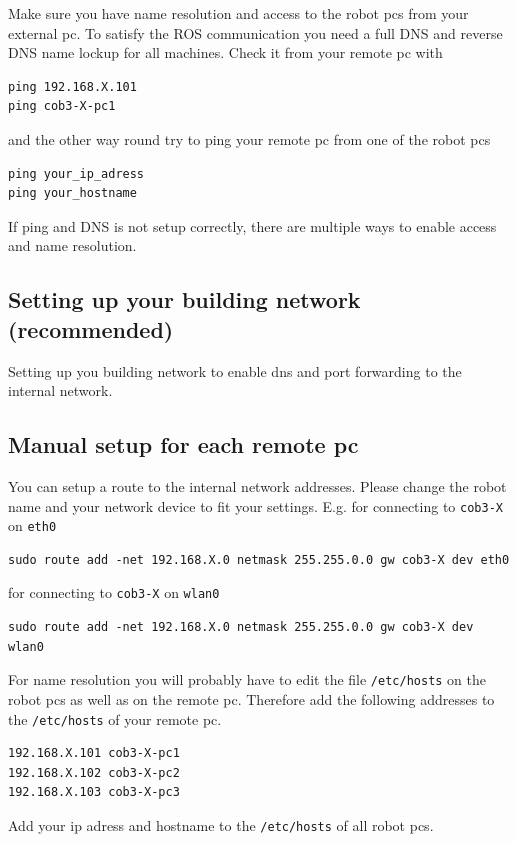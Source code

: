 Make sure you have name resolution and access to the robot pcs from your external pc. To satisfy the ROS communication you need a full DNS and reverse DNS name lockup for all machines. Check it from your remote pc with
\begin{lstlisting}
ping 192.168.X.101
ping cob3-X-pc1
\end{lstlisting}
and the other way round try to ping your remote pc from one of the robot pcs
\begin{lstlisting}
ping your_ip_adress
ping your_hostname
\end{lstlisting}

If ping and DNS is not setup correctly, there are multiple ways to enable access and name resolution.

\subsection{Setting up your building network (recommended)}
Setting up you building network to enable dns and port forwarding to the internal network.

\subsection{Manual setup for each remote pc}
You can setup a route to the internal network addresses. Please change the robot name and your network device to fit your settings. E.g. for connecting to \texttt{cob3-X} on \texttt{eth0}
\begin{lstlisting}
sudo route add -net 192.168.X.0 netmask 255.255.0.0 gw cob3-X dev eth0
\end{lstlisting}

for connecting to \texttt{cob3-X} on \texttt{wlan0}
\begin{lstlisting}
sudo route add -net 192.168.X.0 netmask 255.255.0.0 gw cob3-X dev wlan0
\end{lstlisting}


For name resolution you will probably have to edit the file \texttt{/etc/hosts} on the robot pcs as well as on the remote pc. Therefore add the following addresses to the \texttt{/etc/hosts} of your remote pc.
\begin{lstlisting}
192.168.X.101 cob3-X-pc1
192.168.X.102 cob3-X-pc2
192.168.X.103 cob3-X-pc3
\end{lstlisting}

Add your ip adress and hostname to the \texttt{/etc/hosts} of all robot pcs.


